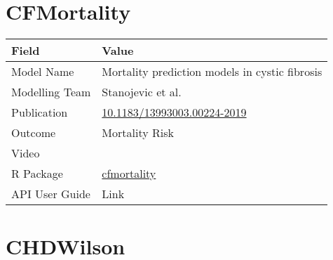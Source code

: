 \documentclass[
]{book}
\begin{document}
\hypertarget{cfmortality}{%
\chapter{CFMortality}\label{cfmortality}}

\begin{longtable}[]{@{}ll@{}}
\toprule
Field & Value\tabularnewline
\midrule
\endhead
Model Name & Mortality prediction models in cystic fibrosis\tabularnewline
Modelling Team & Stanojevic et al.\tabularnewline
Publication & \href{https://doi.org/10.1183/13993003.00224-2019}{10.1183/13993003.00224-2019}\tabularnewline
Outcome & Mortality Risk\tabularnewline
Video & \href{}{}\tabularnewline
R Package & \href{https://cran.r-project.org/package=cfmortality}{cfmortality}\tabularnewline
API User Guide & Link\tabularnewline
\bottomrule
\end{longtable}

\hypertarget{chdwilson}{%
\chapter{CHDWilson}\label{chdwilson}}
\end{document}
